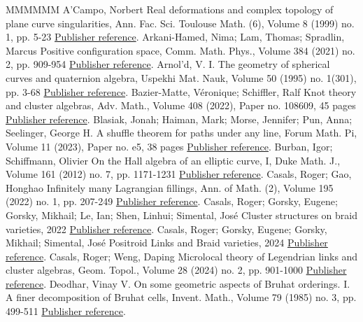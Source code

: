 \documentclass[11pt]{article}
\theoremstyle{definition}
\numberwithin{equation}{section}
\begin{document}
\begin{thebibliography}{MMMMMM}
 A’Campo, Norbert Real deformations and complex topology of plane curve singularities, Ann. Fac. Sci. Toulouse Math. (6), Volume 8 (1999) no. 1, pp. 5-23 \href{https://alco.centre-mersenne.org/articles/10.5802/alco.345/#ACampo}{Publisher reference}.
 Arkani-Hamed, Nima; Lam, Thomas; Spradlin, Marcus Positive configuration space, Comm. Math. Phys., Volume 384 (2021) no. 2, pp. 909-954 \href{https://alco.centre-mersenne.org/articles/10.5802/alco.345/#ALS}{Publisher reference}.
 Arnol’d, V. I. The geometry of spherical curves and quaternion algebra, Uspekhi Mat. Nauk, Volume 50 (1995) no. 1(301), pp. 3-68 \href{https://alco.centre-mersenne.org/articles/10.5802/alco.345/#Arnold}{Publisher reference}.
 Bazier-Matte, Véronique; Schiffler, Ralf Knot theory and cluster algebras, Adv. Math., Volume 408 (2022), Paper no. 108609, 45 pages \href{https://alco.centre-mersenne.org/articles/10.5802/alco.345/#BMS}{Publisher reference}.
 Blasiak, Jonah; Haiman, Mark; Morse, Jennifer; Pun, Anna; Seelinger, George H. A shuffle theorem for paths under any line, Forum Math. Pi, Volume 11 (2023), Paper no. e5, 38 pages \href{https://alco.centre-mersenne.org/articles/10.5802/alco.345/#BHMPS}{Publisher reference}.
 Burban, Igor; Schiffmann, Olivier On the Hall algebra of an elliptic curve, I, Duke Math. J., Volume 161 (2012) no. 7, pp. 1171-1231 \href{https://alco.centre-mersenne.org/articles/10.5802/alco.345/#BuSc}{Publisher reference}.
 Casals, Roger; Gao, Honghao Infinitely many Lagrangian fillings, Ann. of Math. (2), Volume 195 (2022) no. 1, pp. 207-249 \href{https://alco.centre-mersenne.org/articles/10.5802/alco.345/#CG}{Publisher reference}.
 Casals, Roger; Gorsky, Eugene; Gorsky, Mikhail; Le, Ian; Shen, Linhui; Simental, José Cluster structures on braid varieties, 2022 \href{https://alco.centre-mersenne.org/articles/10.5802/alco.345/#CGGLSS}{Publisher reference}.
 Casals, Roger; Gorsky, Eugene; Gorsky, Mikhail; Simental, José Positroid Links and Braid varieties, 2024 \href{https://alco.centre-mersenne.org/articles/10.5802/alco.345/#CGGS}{Publisher reference}.
 Casals, Roger; Weng, Daping Microlocal theory of Legendrian links and cluster algebras, Geom. Topol., Volume 28 (2024) no. 2, pp. 901-1000 \href{https://alco.centre-mersenne.org/articles/10.5802/alco.345/#CW}{Publisher reference}.
 Deodhar, Vinay V. On some geometric aspects of Bruhat orderings. I. A finer decomposition of Bruhat cells, Invent. Math., Volume 79 (1985) no. 3, pp. 499-511 \href{https://alco.centre-mersenne.org/articles/10.5802/alco.345/#Deodhar}{Publisher reference}.

\end{thebibliography}
\end{document}
